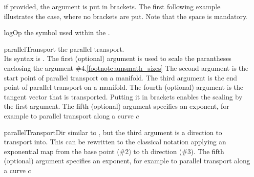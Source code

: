 \documentclass[english,a4paper,DIV=12,parskip=full,oneside]{scrartcl}
\begin{document}
\begin{commandlist}
		if provided, the argument is put in brackets. The first following example
		illustrates the case, where no brackets are put. Note that the space is
		mandatory.
		\par{}
		\par{}
		\par{}
	\item[logOp] the symbol used within the \codeCommand{\logarithm}.
		\par\mathCodeExample{\logOp}
	\item[parallelTransport] the parallel transport.\\
		Its syntax is .
		The first (optional) argument is used to scale the parantheses enclosing the argument \#4.\cref{footnote:amsmath_sizes}
		The second argument is the start point of parallel transport on a manifold.
		The third argument is the end point of parallel transport on a manifold.
		The fourth (optional) argument is the tangent vector that is transported.
		Putting it in brackets enables the scaling by the first argument.
		The fifth (optional) argument specifies an exponent, for example to parallel transport along a curve $c$
		\par{}
		\par{}
		\par{}
		\par{}
		\par{}
	\item[parallelTransportDir] similar to \codeCommand{\parallelTransport}, but the third
		argument is a direction to transport into. This can be rewritten to the classical notation
		applying an exponential map from the base point (\#2) to th direction (\#3).
		The fifth (optional) argument specifies an exponent, for example to parallel transport along a curve $c$
		\par{}
		\par{}
		\par{}
		\par{}
		\par{}

\end{commandlist}
\end{document}
